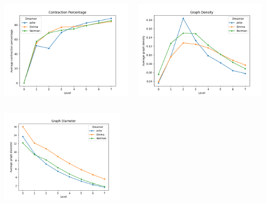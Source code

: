 \begin{minipage}[t]{\textwidth}
    \begin{columns}
    \begin{column}{0.45\textwidth}
        \includegraphics[width=\textwidth]{immagini/contraction_percentage}
    \end{column}
    \begin{column}{0.45\textwidth}
        \includegraphics[width=\textwidth]{immagini/graph_density}
    \end{column}
    \end{columns}
    \end{minipage}
\begin{minipage}[t]{\textwidth}
    \vspace{-0.1cm}
    \centering
    \includegraphics[width=0.45\textwidth]{immagini/graph_diameter}
\end{minipage}